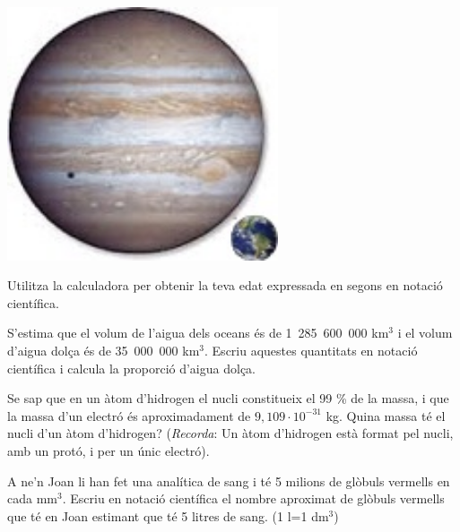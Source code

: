 \begin{mylist}
\begin{minipage}[t]{0.7\textwidth}
\end{minipage}
\begin{minipage}{0.3\textwidth}
	\centering
	\vspace{2cm}
	\includegraphics[width=0.6\textwidth]{img-02/jupiter}
\end{minipage}





\exer  Utilitza la calculadora per obtenir la teva edat expressada en segons en notació científica.

 


\exer  S'estima que el volum de l'aigua dels oceans és de 1~285~600~000 km${}^{3}$ i el volum d'aigua dolça és de 35~000~000 km${}^{3}$. Escriu aquestes quantitats en notació científica i calcula la proporció d'aigua dolça.

 


\exer  Se sap que en un àtom d'hidrogen el nucli constitueix el 99 \% de la massa, i que la massa d'un electró és aproximadament de  $9,109 \cdot 10^{-31}$ kg. Quina massa té el nucli d'un àtom d'hidrogen? (\textit{Recorda}: Un àtom d'hidrogen està format pel nucli, amb un protó, i per un únic electró).

 


\exer  A ne'n Joan li han fet una analítica de sang i té 5 milions de glòbuls vermells en cada mm${}^{3}$. Escriu en notació científica el nombre aproximat de glòbuls vermells que té en Joan estimant que té 5 litres de sang. (1 l=1 dm$^3$)

\end{mylist}

